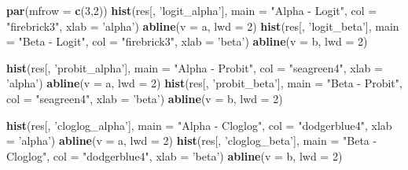 \documentclass[]{article}
\newenvironment{Shaded}{\begin{snugshade}}{\end{snugshade}}
\newcommand{\DataTypeTok}[1]{\textcolor[rgb]{0.13,0.29,0.53}{#1}}
\newcommand{\DecValTok}[1]{\textcolor[rgb]{0.00,0.00,0.81}{#1}}
\newcommand{\KeywordTok}[1]{\textcolor[rgb]{0.13,0.29,0.53}{\textbf{#1}}}
\newcommand{\NormalTok}[1]{#1}
\newcommand{\StringTok}[1]{\textcolor[rgb]{0.31,0.60,0.02}{#1}}
\begin{document}
\begin{Shaded}
\begin{Highlighting}[]
\KeywordTok{par}\NormalTok{(}\DataTypeTok{mfrow =} \KeywordTok{c}\NormalTok{(}\DecValTok{3}\NormalTok{,}\DecValTok{2}\NormalTok{))}
\KeywordTok{hist}\NormalTok{(res[, }\StringTok{'logit_alpha'}\NormalTok{], }\DataTypeTok{main =} \StringTok{"Alpha - Logit"}\NormalTok{, }\DataTypeTok{col =} \StringTok{"firebrick3"}\NormalTok{, }\DataTypeTok{xlab =} \StringTok{'alpha'}\NormalTok{) }
\KeywordTok{abline}\NormalTok{(}\DataTypeTok{v =}\NormalTok{ a, }\DataTypeTok{lwd =} \DecValTok{2}\NormalTok{)}
\KeywordTok{hist}\NormalTok{(res[, }\StringTok{'logit_beta'}\NormalTok{], }\DataTypeTok{main =} \StringTok{"Beta - Logit"}\NormalTok{, }\DataTypeTok{col =} \StringTok{"firebrick3"}\NormalTok{, }\DataTypeTok{xlab =} \StringTok{'beta'}\NormalTok{) }
\KeywordTok{abline}\NormalTok{(}\DataTypeTok{v =}\NormalTok{ b, }\DataTypeTok{lwd =} \DecValTok{2}\NormalTok{)}

\KeywordTok{hist}\NormalTok{(res[, }\StringTok{'probit_alpha'}\NormalTok{], }\DataTypeTok{main =} \StringTok{"Alpha - Probit"}\NormalTok{, }\DataTypeTok{col =} \StringTok{"seagreen4"}\NormalTok{, }\DataTypeTok{xlab =} \StringTok{'alpha'}\NormalTok{) }
\KeywordTok{abline}\NormalTok{(}\DataTypeTok{v =}\NormalTok{ a, }\DataTypeTok{lwd =} \DecValTok{2}\NormalTok{)}
\KeywordTok{hist}\NormalTok{(res[, }\StringTok{'probit_beta'}\NormalTok{], }\DataTypeTok{main =} \StringTok{"Beta - Probit"}\NormalTok{, }\DataTypeTok{col =} \StringTok{"seagreen4"}\NormalTok{, }\DataTypeTok{xlab =} \StringTok{'beta'}\NormalTok{) }
\KeywordTok{abline}\NormalTok{(}\DataTypeTok{v =}\NormalTok{ b, }\DataTypeTok{lwd =} \DecValTok{2}\NormalTok{)}

\KeywordTok{hist}\NormalTok{(res[, }\StringTok{'cloglog_alpha'}\NormalTok{], }\DataTypeTok{main =} \StringTok{"Alpha - Cloglog"}\NormalTok{, }\DataTypeTok{col =} \StringTok{"dodgerblue4"}\NormalTok{, }\DataTypeTok{xlab =} \StringTok{'alpha'}\NormalTok{) }
\KeywordTok{abline}\NormalTok{(}\DataTypeTok{v =}\NormalTok{ a, }\DataTypeTok{lwd =} \DecValTok{2}\NormalTok{)}
\KeywordTok{hist}\NormalTok{(res[, }\StringTok{'cloglog_beta'}\NormalTok{], }\DataTypeTok{main =} \StringTok{"Beta - Cloglog"}\NormalTok{, }\DataTypeTok{col =} \StringTok{"dodgerblue4"}\NormalTok{, }\DataTypeTok{xlab =} \StringTok{'beta'}\NormalTok{) }
\KeywordTok{abline}\NormalTok{(}\DataTypeTok{v =}\NormalTok{ b, }\DataTypeTok{lwd =} \DecValTok{2}\NormalTok{)}
\end{Highlighting}
\end{Shaded}
\end{document}
